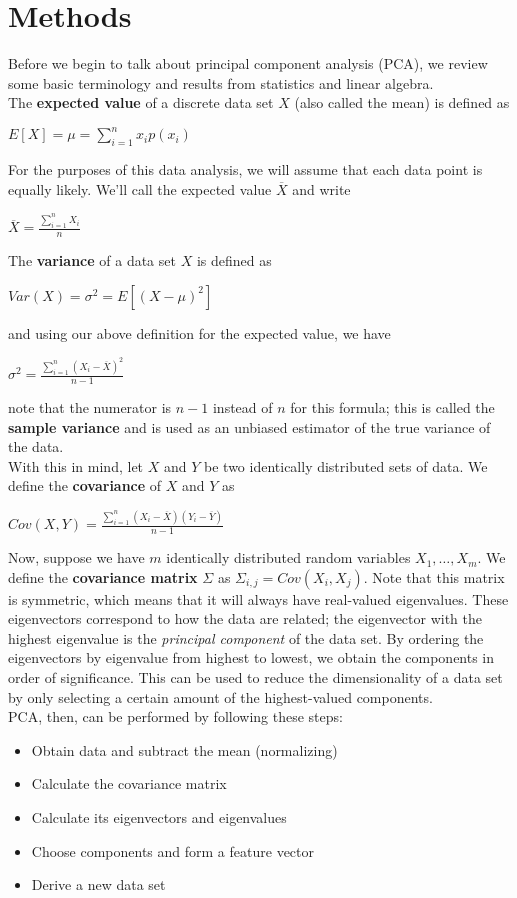\documentclass[twocolumn]{article}
\begin{document}
\section{Methods} %
\label{sec:methods}
Before we begin to talk about principal component analysis (PCA), we review some basic terminology and results from statistics and linear algebra.\\
The \textbf{expected value} of a discrete data set $X$ (also called the mean) is defined as
\begin{center}
$\displaystyle E[X] = \mu =  \sum_{i=1}^{n}x_ip(x_i)$
\end{center}
For the purposes of this data analysis, we will assume that each data point is equally likely. We'll call the expected value 
$\overline{X}$ and write
\begin{center}
$\displaystyle \overline{X} = \frac{\sum_{i=1}^{n}X_i}{n}$
\end{center}
The \textbf{variance} of a data set $X$ is defined as
\begin{center}
$\displaystyle Var(X) = \sigma^2 = E\left[\left(X-\mu\right)^2\right]$
\end{center} 
and using our above definition for the expected value, we have
\begin{center}
$\displaystyle \sigma^2 = 
\frac{\sum_{i=1}^{n}(X_i - \overline{X})^2}{n-1}$
\end{center}
note that the numerator is $n-1$ instead of $n$ for this formula; this is called the \textbf{sample variance} and is used as an unbiased estimator of the true variance of the data.\\
With this in mind, let $X$ and $Y$ be two identically distributed sets of data. We define the \textbf{covariance} of $X$ and $Y$ as
\begin{center}
$Cov(X, Y) = 
\frac{\sum_{i=1}^{n}(X_i-\overline{X})(Y_i-\overline{Y})}{n-1}$
\end{center}
Now, suppose we have $m$ identically distributed random variables $X_1, \ldots, X_m$. We define the \textbf{covariance matrix} $\Sigma$ as $\Sigma_{i, j} = Cov(X_i, X_j)$. Note that this matrix is symmetric, which means that it will always have real-valued eigenvalues. These eigenvectors correspond to how the data are related; the eigenvector with the highest eigenvalue is the \emph{principal component} of the data set. By ordering the eigenvectors by eigenvalue from highest to lowest, we obtain the components in order of significance. This can be used to reduce the dimensionality of a data set by only selecting a certain amount of the highest-valued components.\\
PCA, then, can be performed by following these steps:
\begin{itemize}
    \item Obtain data and subtract the mean (normalizing)
    \item Calculate the covariance matrix
    \item Calculate its eigenvectors and eigenvalues
    \item Choose components and form a feature vector
    \item Derive a new data set
\end{itemize}



\end{document}
